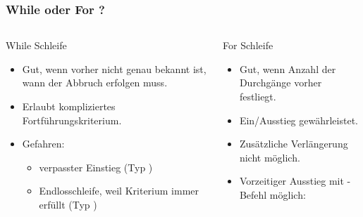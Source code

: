       \begin{frame}
          \frametitle{While oder For ?}
          \begin{columns}[t]
            \begin{column}{5cm}
              While Schleife
              \begin{itemize}
                \item Gut, wenn vorher nicht genau bekannt ist, wann der Abbruch erfolgen muss.
                \item Erlaubt kompliziertes Fortführungskriterium.
                \item \alert{Gefahren}:
                \begin{itemize}
                  \item verpasster Einstieg (Typ )
                  \item Endlosschleife, weil Kriterium immer erfüllt (Typ )
                \end{itemize}
              \end{itemize}
            \end{column}

            \begin{column}{6cm}
              For Schleife
              \begin{itemize}
                \item Gut, wenn Anzahl der Durchgänge vorher festliegt.
                \item Ein/Ausstieg gewährleistet.
                \item Zusätzliche Verlängerung nicht möglich.
                \item Vorzeitiger Ausstieg mit -Befehl möglich:
                
              \end{itemize}
            \end{column}
          \end{columns}
      \end{frame}

